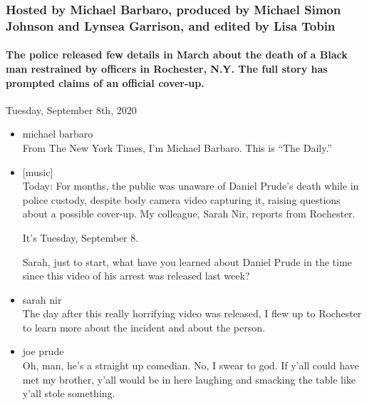 \hypertarget{hosted-by-michael-barbaro-produced-by-michael-simon-johnson-and-lynsea-garrison-and-edited-by-lisa-tobin-1}{%
\subsubsection{Hosted by Michael Barbaro, produced by Michael Simon
Johnson and Lynsea Garrison, and edited by Lisa
Tobin}\label{hosted-by-michael-barbaro-produced-by-michael-simon-johnson-and-lynsea-garrison-and-edited-by-lisa-tobin-1}}

\hypertarget{the-police-released-few-details-in-march-about-the-death-of-a-black-man-restrained-by-officers-in-rochester-ny-the-full-story-has-prompted-claims-of-an-official-cover-up-2}{%
\paragraph{The police released few details in March about the death of a
Black man restrained by officers in Rochester, N.Y. The full story has
prompted claims of an official
cover-up.}\label{the-police-released-few-details-in-march-about-the-death-of-a-black-man-restrained-by-officers-in-rochester-ny-the-full-story-has-prompted-claims-of-an-official-cover-up-2}}

Tuesday, September 8th, 2020

\begin{itemize}
\item
  michael barbaro\\
  From The New York Times, I'm Michael Barbaro. This is ``The Daily.''
\item
  {[}music{]}\\
  Today: For months, the public was unaware of Daniel Prude's death
  while in police custody, despite body camera video capturing it,
  raising questions about a possible cover-up. My colleague, Sarah Nir,
  reports from Rochester.

  It's Tuesday, September 8.

  Sarah, just to start, what have you learned about Daniel Prude in the
  time since this video of his arrest was released last week?
\item
  sarah nir\\
  The day after this really horrifying video was released, I flew up to
  Rochester to learn more about the incident and about the person.
\item
  joe prude\\
  Oh, man, he's a straight up comedian. No, I swear to god. If y'all
  could have met my brother, y'all would be in here laughing and
  smacking the table like y'all stole something.
\end{itemize}

